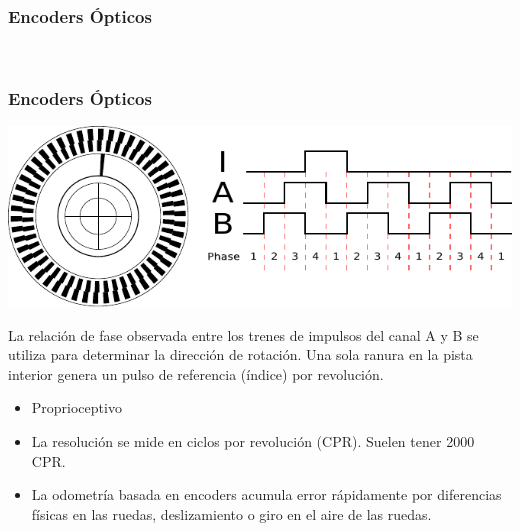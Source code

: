 \begin{frame}
    \frametitle{Encoders Ópticos}
    
    \begin{figure}[!h]
        \centering
        \\
    \end{figure}
\end{frame}

\begin{frame}
    \frametitle{Encoders Ópticos}

    \includegraphics[width=\columnwidth]{images/encoder.pdf}
    \footnotesize

    La relación de fase observada entre los trenes de impulsos del canal A y B se utiliza para determinar la dirección de rotación. Una sola ranura en la pista interior genera un pulso de referencia (índice) por revolución.

    \begin{itemize}
        \item Proprioceptivo
        \item La resolución se mide en ciclos por revolución (CPR). Suelen tener 2000 CPR.
        \item La odometría basada en encoders acumula error rápidamente por diferencias físicas en las ruedas, deslizamiento o giro en el aire de las ruedas.
    \end{itemize}
\end{frame}



